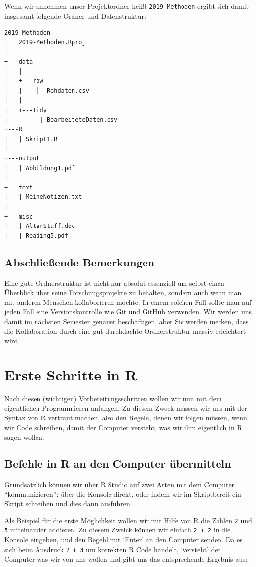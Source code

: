 \documentclass[]{tufte-book}
\begin{document}
Wenn wir annehmen unser Projektordner heißt \texttt{2019-Methoden}
ergibt sich damit insgesamt folgende Ordner und Datenstruktur:

\begin{verbatim}
2019-Methoden
│   2019-Methoden.Rproj
│
+---data
│   │
│   +---raw
│   |    │  Rohdaten.csv
|   |
|   +---tidy
|         | BearbeiteteDaten.csv
+---R
|   | Skript1.R
|
+---output
|   | Abbildung1.pdf
|
+---text
|   | MeineNotizen.txt
|
+---misc
|   | AlterStuff.doc
|   | Reading5.pdf
\end{verbatim}

\section{Abschließende Bemerkungen}\label{abschlieende-bemerkungen}

Eine gute Ordnerstruktur ist nicht nur absolut essenziell um selbst
einen Überblick über seine Forschungsprojekte zu behalten, sondern auch
wenn man mit anderen Menschen kollaborieren möchte. In einem solchen
Fall sollte man auf jeden Fall eine Versionskontrolle wie Git und GitHub
verwenden. Wir werden uns damit im nächsten Semester genauer
beschäftigen, aber Sie werden merken, dass die Kollaboration durch eine
gut durchdachte Ordnerstruktur massiv erleichtert wird.

\chapter{Erste Schritte in R}\label{basics}

Nach diesen (wichtigen) Vorbereitungsschritten wollen wir nun mit dem
eigentlichen Programmieren anfangen. Zu diesem Zweck müssen wir uns mit
der Syntax von R vertraut machen, also den Regeln, denen wir folgen
müssen, wenn wir Code schreiben, damit der Computer versteht, was wir
ihm eigentlich in R sagen wollen.

\section{Befehle in R an den Computer
übermitteln}\label{befehle-in-r-an-den-computer-ubermitteln}

Grundsätzlich können wir über R Studio auf zwei Arten mit dem Computer
``kommunizieren'': über die Konsole direkt, oder indem wir im
Skriptbereit ein Skript schreiben und dies dann ausführen.

Als Beispiel für die erste Möglichkeit wollen wir mit Hilfe von R die
Zahlen \texttt{2} und \texttt{5} miteinander addieren. Zu diesem Zweick
können wir einfach \texttt{2\ +\ 2} in die Konsole eingeben, und den
Begehl mit `Enter' an den Computer senden. Da es sich beim Ausdruck
\texttt{2\ +\ 3} um korrekten R Code handelt, `versteht' der Computer
was wir von uns wollen und gibt uns das entsprechende Ergebnis aus:
\end{document}

